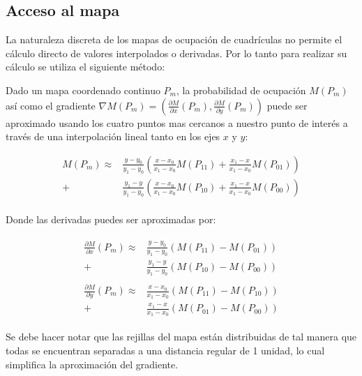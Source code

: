 \documentclass[10pt,a4paper]{article}
\begin{document}
\subsection{Acceso al mapa}

La naturaleza discreta de los mapas de ocupación de cuadrículas no permite el cálculo directo de valores interpolados o derivadas. Por lo tanto para realizar su cálculo se utiliza el siguiente método:

Dado un mapa coordenado continuo $ P_{m} $, la probabilidad de ocupación $ M(P_{m}) $ así como el gradiente 
$\nabla M(P_{m}) =  ( 
\frac{\partial M}{\partial x} (P_{m}),
\frac{\partial M}{\partial y} (P_{m})
)$
puede ser aproximado usando los cuatro puntos mas cercanos a nuestro punto de interés a través de una interpolación lineal tanto en los ejes $ x $ y $ y $:

\begin{equation}
	\begin{aligned}
	M(P_{m}) \approx
		&
		\frac{y - y_{0}}{y_{1} - y_{0}} \left(
			\frac{x - x_{0}}{x_{1} - x_{0}} M(P_{11}) +
			\frac{x_{1} - x}{x_{1} - x_{0}} M(P_{01})
		\right)
		\\ + &
		\frac{y_{1} - y}{y_{1} - y_{0}} \left(
			\frac{x - x_{0}}{x_{1} - x_{0}}	M(P_{10}) +	
			\frac{x_{1} - x}{x_{1} - x_{0}} M(P_{00})
		\right)	
	\end{aligned}
\end{equation} \\

Donde las derivadas puedes ser aproximadas por:

\begin{align}
	\begin{aligned}
		\frac{\partial M}{\partial x} (P_{m}) \approx
		&
			\frac{y - y_{0}}{y_{1} - y_{0}} ( M(P_{11}) - M(P_{01}) )
		\\ + &
			\frac{y_{1} - y}{y_{1} - y_{0}} ( M(P_{10}) - M(P_{00}) )
	\end{aligned} \\
	\begin{aligned}
		\frac{\partial M}{\partial y} (P_{m}) \approx
		&
			\frac{x - x_{0}}{x_{1} - x_{0}} ( M(P_{11}) - M(P_{10}) )
		\\ + &
			\frac{x_{1} - x}{x_{1} - x_{0}} ( M(P_{01}) - M(P_{00}) )
	\end{aligned}
\end{align}

Se debe hacer notar que las rejillas del mapa están distribuidas de tal manera que todas se encuentran separadas a una distancia regular de 1 unidad, lo cual simplifica la aproximación del gradiente.
\end{document}

